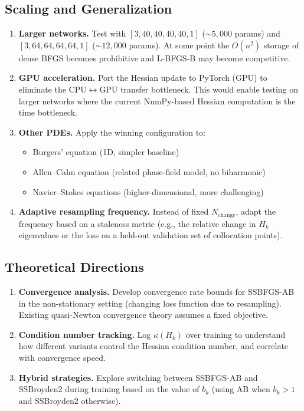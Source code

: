\documentclass[11pt,a4paper]{article}
\newcommand{\Hk}{H_k}
\begin{document}
\subsection{Scaling and Generalization}

\begin{enumerate}[resume]
  \item \textbf{Larger networks.}  Test with $[3, 40, 40, 40, 40, 1]$
        ($\sim 5{,}000$ params) and $[3, 64, 64, 64, 64, 1]$ ($\sim 12{,}000$
        params).  At some point the $O(n^2)$ storage of dense BFGS becomes
        prohibitive and L-BFGS-B may become competitive.

  \item \textbf{GPU acceleration.}  Port the Hessian update to PyTorch
        (GPU) to eliminate the CPU$\leftrightarrow$GPU transfer bottleneck.
        This would enable testing on larger networks where the current
        NumPy-based Hessian computation is the time bottleneck.

  \item \textbf{Other PDEs.}  Apply the winning configuration to:
    \begin{itemize}[nosep]
      \item Burgers' equation (1D, simpler baseline)
      \item Allen--Cahn equation (related phase-field model, no biharmonic)
      \item Navier--Stokes equations (higher-dimensional, more challenging)
    \end{itemize}

  \item \textbf{Adaptive resampling frequency.}  Instead of fixed
        $N_{\text{change}}$, adapt the frequency based on a staleness
        metric (e.g., the relative change in $\Hk$ eigenvalues or the
        loss on a held-out validation set of collocation points).
\end{enumerate}

\subsection{Theoretical Directions}

\begin{enumerate}[resume]
  \item \textbf{Convergence analysis.}  Develop convergence rate bounds
        for SSBFGS-AB in the non-stationary setting (changing loss function
        due to resampling).  Existing quasi-Newton convergence theory assumes
        a fixed objective.

  \item \textbf{Condition number tracking.}  Log $\kappa(\Hk)$ over training
        to understand how different variants control the Hessian condition
        number, and correlate with convergence speed.

  \item \textbf{Hybrid strategies.}  Explore switching between SSBFGS-AB
        and SSBroyden2 during training based on the value of $b_k$
        (using AB when $b_k > 1$ and SSBroyden2 otherwise).
\end{enumerate}
\end{document}
